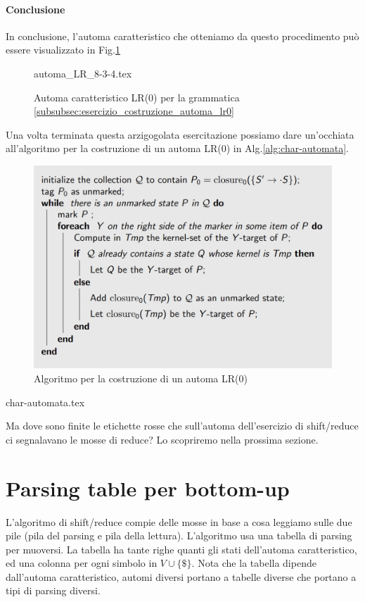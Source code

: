 \documentclass[class=book, crop=false, oneside, 12pt]{standalone}
\begin{document}
\paragraph{Conclusione}
In conclusione, l'automa caratteristico che otteniamo da questo procedimento può essere visualizzato in Fig.\ref{charateristic-automata_cosntruction}
\begin{figure}[H]
    \centering
	{automa_LR_8-3-4.tex}
    \caption{Automa caratteristico LR(0) per la grammatica \ref{subsubsec:esercizio_costruzione_automa_lr0}}
    \label{charateristic-automata_cosntruction}    
\end{figure}

Una volta terminata questa arzigogolata esercitazione possiamo dare un'occhiata all'algoritmo per la costruzione di un automa LR(0) in Alg.\ref{alg:char-automata}. \\
\begin{figure}[H]
    \centering
    \includegraphics[width=.8\textwidth]{lr0-automata_construction_algorithm.jpg}
    \caption{Algoritmo per la costruzione di un automa LR(0)}
    \label{lr0-automata_construction_algorithm}    
\end{figure}
{char-automata.tex}

Ma dove sono finite le etichette rosse che sull'automa dell'esercizio di shift/reduce ci segnalavano le mosse di reduce? Lo scopriremo nella prossima sezione.

\section{Parsing table per bottom-up}
L'algoritmo di shift/reduce compie delle mosse in base a cosa leggiamo sulle due pile (pila del parsing e pila della lettura). L'algoritmo usa una tabella di parsing per muoversi. La tabella ha tante righe quanti gli stati dell'automa caratteristico, ed una colonna per ogni simbolo in \(V \cup \{ \$ \}\). Nota che la tabella dipende dall'automa caratteristico, automi diversi portano a tabelle diverse che portano a tipi di parsing diversi.
\end{document}
